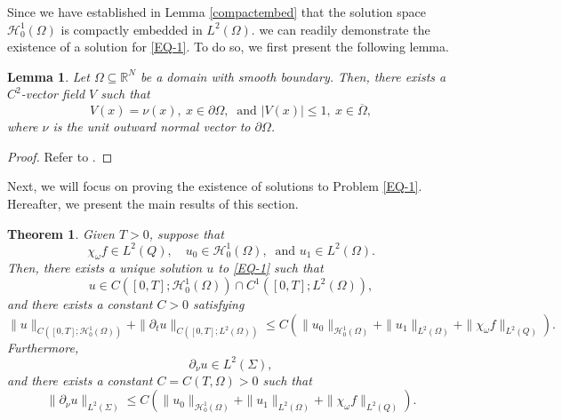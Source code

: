 \documentclass[11pt]{article}
\newtheorem{theorem}{Theorem}[section]
\newtheorem{lemma}{Lemma}[section]
\numberwithin{equation}{section}
\def\pt{\partial}
\def\s{\subseteq}
\def\ol{\overline}
\def\pt{\partial}
\def\Om{\Omega}
\def\mcH{\mathcal{H}}
\newcommand{\R}{\mathbb R}
\begin{document}
		
		
		Since  we have established in Lemma \ref{compactembed} that the solution space
		$\mcH_0^1(\Omega)$  is compactly embedded in $L^2(\Omega)$.
		we can readily demonstrate the existence of a solution for \eqref{EQ-1}. To do so, we first present the following lemma.
		
		
		\begin{lemma}\label{L2.3}
			Let $\Om\s \R^N$ be a domain with smooth boundary. Then, there exists a $C^2$-vector field $V$ such that
			\begin{equation*}
				V(x)=\nu(x), \ x\in \pt\Om, \ \mbox{ and } |V(x)|\leq 1, \ x\in \ol{\Om},
			\end{equation*}
			where $\nu$   is the unit outward normal vector to $\pt\Om$.
		\end{lemma}
		\begin{proof}
			Refer to \cite[Lemma 2.3, p. 61]{Bellassoued2017}.
		\end{proof}
		
		
		Next, we will focus on proving the existence of solutions to Problem \eqref{EQ-1}. Hereafter, we present the main results of this section.
		
		\begin{theorem}\label{T2.2}
			Given $T>0$, suppose that
			\begin{equation*}
				\chi_\omega f\in L^2(Q), \quad u_0\in \mcH_0^1(\Om), \ \mbox{ and } u_1\in L^2(\Om).
			\end{equation*}
			Then, there exists a unique solution $u$ to  \eqref{EQ-1} such that
			\begin{equation*}
				u\in C([0,T]; \mcH_0^1(\Om))\cap C^1([0,T]; L^2(\Om)),
			\end{equation*}
			and there exists a constant $C>0$ satisfying
			\begin{equation}\label{10.02.1}
				\|u\|_{C([0,T]; \mcH_0^1(\Om))}+\|\pt_tu\|_{C([0,T]; L^2(\Om))}\leq C\left(\|u_0\|_{\mcH_0^1(\Om)}+\|u_1\|_{L^2(\Om)}+\|\chi_\omega f\|_{L^2(Q)}\right).
			\end{equation}
			Furthermore,
			\begin{equation*}
				\pt_\nu u\in L^2(\Sigma),
			\end{equation*}
			and there exists a constant $C=C(T, \Om)>0$ such that
			\begin{equation}\label{10.02.4}
				\|\pt_\nu u\|_{L^2(\Sigma)}\leq C\left(\|u_0\|_{\mcH_0^1(\Om)}+\|u_1\|_{L^2(\Om)}+\|\chi_\omega f\|_{L^2(Q)}\right).
			\end{equation}
		\end{theorem}
		
\end{document}
